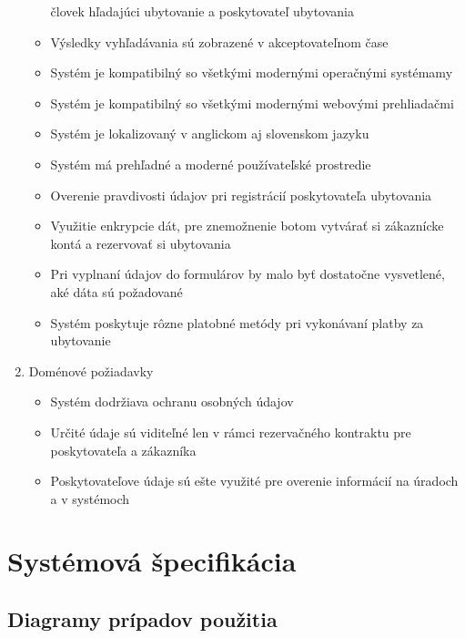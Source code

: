 \begin{enumerate}[label=\Alph*.]
\begin{itemize}
        človek hľadajúci ubytovanie a poskytovateľ ubytovania
        \item Výsledky vyhľadávania sú zobrazené v akceptovateľnom čase
        \item Systém je kompatibilný so všetkými modernými operačnými
        systémamy
        \item Systém je kompatibilný so všetkými modernými webovými 
        prehliadačmi
        \item Systém je lokalizovaný v anglickom aj slovenskom jazyku
        \item Systém má prehľadné a moderné používateľské prostredie
        \item Overenie pravdivosti údajov pri registrácií poskytovateľa 
        ubytovania
        \item Využitie enkrypcie dát, pre znemožnenie botom vytvárať si 
        zákaznícke kontá a rezervovať si ubytovania
        \item Pri vyplnaní údajov do formulárov by malo byť dostatočne 
        vysvetlené, aké dáta sú požadované
        \item Systém poskytuje rôzne platobné metódy pri vykonávaní platby za 
        ubytovanie
    \end{itemize}
    \item Doménové požiadavky
    \begin{itemize}
        \item Systém dodržiava ochranu osobných údajov
        \item Určité údaje sú viditeľné len v rámci rezervačného kontraktu 
        pre poskytovateľa a zákazníka
        \item Poskytovateľove údaje sú ešte využité pre overenie informácií na 
        úradoch a v systémoch
    \end{itemize}
\end{enumerate}


\section{Systémová špecifikácia}

\subsection{Diagramy prípadov použitia}

